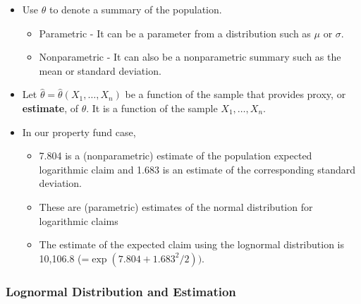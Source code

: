 \documentclass[]{book}
\theoremstyle{definition}
\theoremstyle{definition}
\theoremstyle{definition}
\theoremstyle{remark}
\begin{document}
\begin{itemize}
\item
  Use \(\theta\) to denote a summary of the population.

  \begin{itemize}
  \item
    Parametric - It can be a parameter from a distribution such as
    \(\mu\) or \(\sigma\).
  \item
    Nonparametric - It can also be a nonparametric summary such as the
    mean or standard deviation.
  \end{itemize}
\item
  Let \(\hat{\theta} =\hat{\theta}(X_1, \ldots, X_n)\) be a function of
  the sample that provides proxy, or \textbf{estimate}, of \(\theta\).
  It is a function of the sample \(X_1, \ldots, X_n\).
\item
  In our property fund case,

  \begin{itemize}
  \item
    7.804 is a (nonparametric) estimate of the population expected
    logarithmic claim and 1.683 is an estimate of the corresponding
    standard deviation.
  \item
    These are (parametric) estimates of the normal distribution for
    logarithmic claims
  \item
    The estimate of the expected claim using the lognormal distribution
    is 10,106.8 (=\(\exp(7.804+1.683^2/2))\).
  \end{itemize}
\end{itemize}

\subsubsection{Lognormal Distribution and
Estimation}\label{lognormal-distribution-and-estimation}
\end{document}
